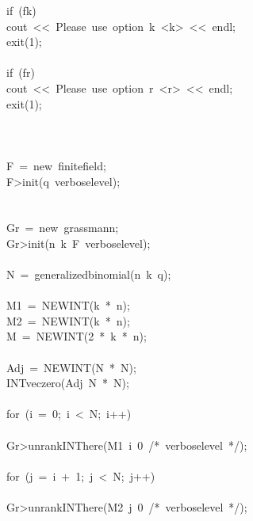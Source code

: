\begin{tabbing}
\>if\ (fk)\ \\[0pt]
\>\>cout\ <<\ Please\ use\ option\ k\ <k>\ <<\ endl;\\[0pt]
\>\>exit(1);\\[0pt]
\>\>\\[0pt]
\>if\ (fr)\ \\[0pt]
\>\>cout\ <<\ Please\ use\ option\ r\ <r>\ <<\ endl;\\[0pt]
\>\>exit(1);\\[0pt]
\>\>\\[0pt]
\>\\[0pt]
\\[0pt]
\>F\ =\ new\ finitefield;\\[0pt]
\>F>init(q\ verboselevel);\\[0pt]
\\[0pt]
\\[0pt]
\>Gr\ =\ new\ grassmann;\\[0pt]
\>Gr>init(n\ k\ F\ verboselevel);\\[0pt]
\\[0pt]
\>N\ =\ generalizedbinomial(n\ k\ q);\\[0pt]
\\[0pt]
\>M1\ =\ NEWINT(k\ *\ n);\\[0pt]
\>M2\ =\ NEWINT(k\ *\ n);\\[0pt]
\>M\ =\ NEWINT(2\ *\ k\ *\ n);\\[0pt]
\\[0pt]
\>Adj\ =\ NEWINT(N\ *\ N);\\[0pt]
\>INTveczero(Adj\ N\ *\ N);\\[0pt]
\\[0pt]
\>for\ (i\ =\ 0;\ i\ <\ N;\ i++)\ \\[0pt]
\>\>\\[0pt]
\>\>Gr>unrankINThere(M1\ i\ 0\ /*\ verboselevel\ */);\\[0pt]
\\[0pt]
\>\>for\ (j\ =\ i\ +\ 1;\ j\ <\ N;\ j++)\ \\[0pt]
\\[0pt]
\>\>\>Gr>unrankINThere(M2\ j\ 0\ /*\ verboselevel\ */);\\[0pt]

\end{tabbing}
